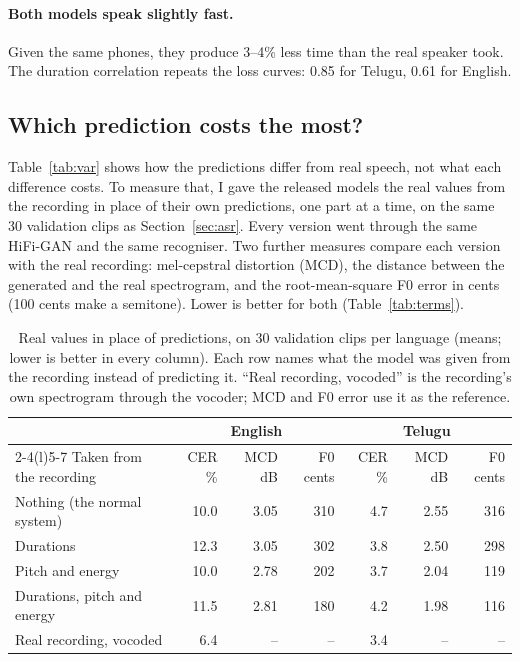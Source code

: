 \documentclass[11pt,a4paper]{article}
\begin{document}
\paragraph{Both models speak slightly fast.} Given the same phones, they produce 3--4\% less time than the real
speaker took. The duration correlation repeats the loss curves: 0.85 for Telugu, 0.61 for English.

\subsection{Which prediction costs the most?}
\label{sec:ablation}
Table~\ref{tab:var} shows how the predictions differ from real speech, not what each difference costs. To measure
that, I gave the released models the real values from the recording in place of their own predictions, one part
at a time, on the same 30 validation clips as Section~\ref{sec:asr}. Every version went through the same HiFi-GAN
and the same recogniser. Two further measures compare each version with the real recording: mel-cepstral
distortion (MCD), the distance between the generated and the real spectrogram, and the root-mean-square F0 error
in cents (100 cents make a semitone). Lower is better for both (Table~\ref{tab:terms}).

\begin{table}[H]\centering\small
\caption{Real values in place of predictions, on 30 validation clips per language (means; lower is better in
every column). Each row names what the model was given from the recording instead of predicting it. ``Real
recording, vocoded'' is the recording's own spectrogram through the vocoder; MCD and F0 error use it as the
reference.}
\label{tab:ablation}
\begin{tabular}{@{}lrrrrrr@{}}
\toprule
 & \multicolumn{3}{c}{English} & \multicolumn{3}{c}{Telugu} \\
\cmidrule(lr){2-4}\cmidrule(l){5-7}
Taken from the recording & CER \% & MCD dB & F0 cents & CER \% & MCD dB & F0 cents \\
\midrule
Nothing (the normal system) & 10.0 & 3.05 & 310 & 4.7 & 2.55 & 316 \\
Durations & 12.3 & 3.05 & 302 & 3.8 & 2.50 & 298 \\
Pitch and energy & 10.0 & 2.78 & 202 & 3.7 & 2.04 & 119 \\
Durations, pitch and energy & 11.5 & 2.81 & 180 & 4.2 & 1.98 & 116 \\
\midrule
Real recording, vocoded & 6.4 & -- & -- & 3.4 & -- & -- \\
\bottomrule
\end{tabular}
\end{table}
\end{document}
